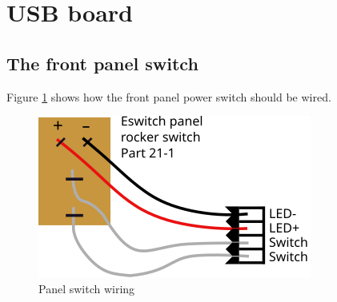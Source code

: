 \section{USB board}

\subsection{The front panel switch}
Figure \ref{fig:panel_switch_wiring} shows how the front panel power switch should be wired.

\begin{figure}[ht]
  \begin{center}
    \includegraphics[clip,scale=1]{figs/panel_switch_wiring}
    \caption{Panel switch wiring \label{fig:panel_switch_wiring}}
  \end{center}
\end{figure}